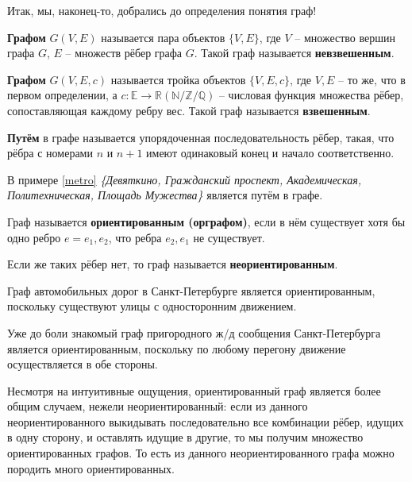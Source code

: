 Итак, мы, наконец-то, добрались до определения понятия граф!

\begin{definition}
	\textbf{Графом} $G(V, E)$ называется пара объектов $\{V, E\}$, где $V$ -- множество вершин графа $G$, $E$ -- множеств рёбер графа $G$. Такой граф называется \textbf{невзвешенным}.
\end{definition}
	
\begin{definition}
	\textbf{Графом} $G(V, E, c)$ называется тройка объектов $\{V, E, c\}$, где $V, E$ -- то же, что в первом определении, а $c: \mathbb{E} \rightarrow \mathbb{R (N/Z/Q)}$ -- числовая функция множества рёбер, сопоставляющая каждому ребру вес. Такой граф называется \textbf{взвешенным}.
\end{definition}

\begin{definition}
	\textbf{Путём} в графе называется упорядоченная последовательность рёбер, такая, что рёбра с номерами $n$ и $n + 1$ имеют одинаковый конец и начало соответственно.
\end{definition}
\begin{example}
	В примере \ref{metro} \textit{\{Девяткино, Гражданский проспект, Академическая, Политехническая, Площадь Мужества\}} является путём в графе.
\end{example}

\begin{definition}
	Граф называется \textbf{ориентированным (орграфом)}, если в нём существует хотя бы одно ребро $e = {e_1, e_2}$, что ребра ${e_2, e_1}$ не существует.
\end{definition}

\begin{definition}
	Если же таких рёбер нет, то граф называется \textbf{неориентированным}.
\end{definition}

\begin{example}
	Граф автомобильных дорог в Санкт-Петербурге является ориентированным, поскольку существуют улицы с односторонним движением.
\end{example}
\begin{example}
	Уже до боли знакомый граф пригородного ж/д сообщения Санкт-Петербурга является ориентированным, поскольку по любому перегону движение осуществляется в обе стороны.
\end{example}

\begin{remark}
	Несмотря на интуитивные ощущения, ориентированный граф является более общим случаем, нежели неориентированный: если из данного неориентированного выкидывать последовательно все комбинации рёбер, идущих в одну сторону, и оставлять идущие в другие, то мы получим множество ориентированных графов. То есть из данного неориентированного графа можно породить много ориентированных.
\end{remark}


